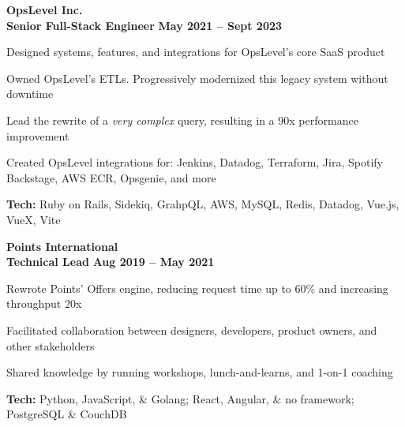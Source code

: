 \documentclass[margin,line]{resume}
\begin{document}
\begin{resume}
    \hspace{-3mm}\textbf{\listing OpsLevel Inc.} \vspace{3mm}\\\vspace{1mm}
    \hspace{1.2mm}\textbf{Senior Full-Stack Engineer} \hfill \textbf{May 2021 -- Sept 2023}\vspace{1mm}
    \begin{list2}
        \item Designed systems, features, and integrations for OpsLevel's core SaaS product
        \vspace{1mm}
        \item Owned OpsLevel's ETLs. Progressively modernized this legacy system without downtime
        \vspace{1mm}
        \item Lead the rewrite of a \textit{very complex} query, resulting in a 90x performance improvement
        \vspace{1mm}
        \item Created OpsLevel integrations for: Jenkins, Datadog, Terraform, Jira, Spotify Backstage, AWS ECR, Opsgenie, and more
        \vspace{1mm}
        \item\textbf{Tech:} Ruby on Rails, Sidekiq, GrahpQL, AWS, MySQL, Redis, Datadog, Vue.js, VueX, Vite
    \end{list2}

    \hspace{-3mm}\textbf{\listing Points International} \vspace{2mm}\\\vspace{1mm}
    \hspace{1.2mm}\textbf{Technical Lead} \hfill \textbf{Aug 2019 -- May 2021}\vspace{1mm}
    \begin{list2}
        \item Rewrote Points’ Offers engine, reducing request time up to 60\% and increasing throughput 20x
        \vspace{1mm}
        \item Facilitated collaboration between designers, developers, product owners, and other stakeholders
        \vspace{1mm}
        \item Shared knowledge by running workshops, lunch-and-learns, and 1-on-1 coaching
        \vspace{1mm}
        \item\textbf{Tech:} Python, JavaScript, \& Golang; React, Angular, \& no framework; PostgreSQL \& CouchDB
    \end{list2}


\end{resume}
\end{document}
